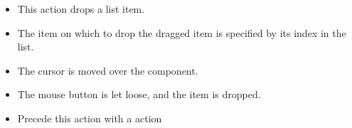 
\begin{itemize}
\item This action drops a list item.
\item The item on which to drop the dragged item is specified by its index in the list.
\item The cursor is moved over the component.
\item The mouse button is let loose, and the item is dropped. 
\item Precede this action with a  action
\end{itemize}
